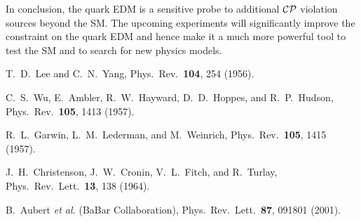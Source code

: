 \documentclass[aps,prd,twocolumn,groupedaddress,showpacs,superscriptaddress,floatfix,nofootinbib,10pt]{revtex4-1}
\begin{document}
In conclusion, the quark EDM is a sensitive probe to additional $\cal CP$ violation sources beyond the SM. The upcoming experiments will significantly improve the constraint on the quark EDM and hence make it a much more powerful tool to test the SM and to search for new physics models. 



\begin{thebibliography}{}

  T.~D.~Lee and C.~N.~Yang,
  Phys.\ Rev.\  {\bf 104}, 254 (1956).


  C.~S.~Wu, E.~Ambler, R.~W.~Hayward, D.~D.~Hoppes, and R.~P.~Hudson,
  Phys.\ Rev.\  {\bf 105}, 1413 (1957).


  R.~L.~Garwin, L.~M.~Lederman, and M.~Weinrich,
  Phys.\ Rev.\  {\bf 105}, 1415 (1957).


  J.~H.~Christenson, J.~W.~Cronin, V.~L.~Fitch, and R.~Turlay,
  Phys.\ Rev.\ Lett.\  {\bf 13}, 138 (1964).


  B.~Aubert {\it et al.} (BaBar Collaboration),
  Phys.\ Rev.\ Lett.\  {\bf 87}, 091801 (2001).



\end{thebibliography}
\end{document}

